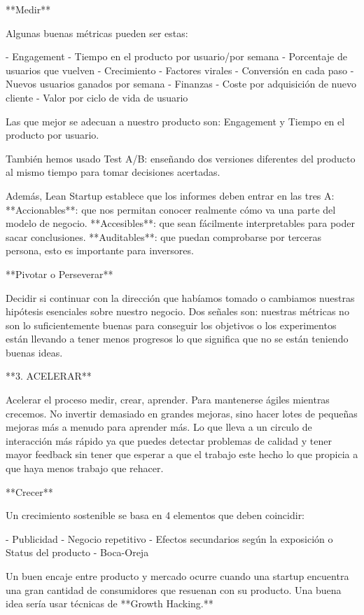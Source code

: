 \documentclass[12pt,twoside,titlepage]{report}
\begin{document}
**Medir**

Algunas buenas métricas pueden ser estas: 

- Engagement
- Tiempo en el producto por usuario/por semana
- Porcentaje de usuarios que vuelven
- Crecimiento
- Factores virales
- Conversión en cada paso
- Nuevos usuarios ganados por semana
- Finanzas
- Coste por adquisición de nuevo cliente
- Valor por ciclo de vida de usuario

Las que mejor se adecuan a nuestro producto son: Engagement y Tiempo en el producto por usuario.

También hemos usado Test A/B: enseñando dos versiones diferentes del producto al mismo tiempo para tomar decisiones acertadas.

Además, Lean Startup establece que los informes deben entrar en las tres A: **Accionables**: que nos permitan conocer realmente cómo va una parte del modelo de negocio. **Accesibles**: que sean fácilmente interpretables para poder sacar conclusiones. **Auditables**: que puedan comprobarse por terceras persona, esto es importante para inversores.

**Pivotar o Perseverar**

Decidir si continuar con la dirección que habíamos tomado o cambiamos nuestras hipótesis esenciales sobre nuestro negocio. Dos señales son: nuestras métricas no son lo suficientemente buenas para conseguir los objetivos o los experimentos están llevando a tener menos progresos lo que significa que no se están teniendo buenas ideas.

**3. ACELERAR**

Acelerar el proceso medir, crear, aprender. Para mantenerse ágiles mientras crecemos. No invertir demasiado en grandes mejoras, sino hacer lotes de pequeñas mejoras más a menudo para aprender más. Lo que lleva a un circulo de interacción más rápido ya que puedes detectar problemas de calidad y tener mayor feedback sin tener que esperar a que el trabajo este hecho lo que propicia a que haya menos trabajo que rehacer.

**Crecer**

Un crecimiento sostenible se basa en 4 elementos que deben coincidir: 

- Publicidad
- Negocio repetitivo
- Efectos secundarios según la exposición o Status del producto
- Boca-Oreja

Un buen encaje entre producto y mercado ocurre cuando una startup encuentra una gran cantidad de consumidores que resuenan con su producto. Una buena idea sería usar técnicas de **Growth Hacking.**
\end{document}
